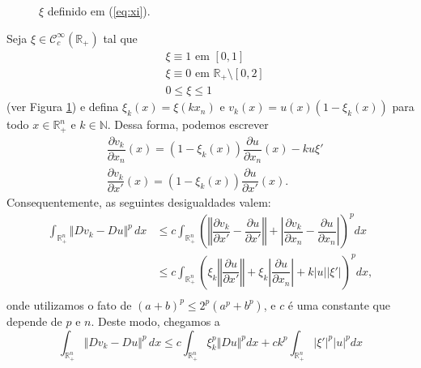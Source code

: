 \documentclass[a4paper, 11pt]{book}
\theoremstyle{definition}
\newcommand{\bN}{\mathbb{N}}
\newcommand{\bR}{\mathbb{R}}
\newcommand{\cC}{\mathcal{C}}
\begin{document}
\begin{prf}
\begin{figure}
        \caption{$\xi$ definido em (\ref{eq:xi}).}
        \label{fig:xi}
    \end{figure}
    Seja $\xi \in \cC^{\infty}_c(\bR_+)$ tal que
    \begin{equation} \label{eq:xi}
        \begin{aligned}
            &\xi \equiv 1 \text{ em } [0,1]\\
            &\xi \equiv 0 \text{ em } \bR_+ \setminus [0,2]\\
            &0 \leqslant \xi \leqslant 1
        \end{aligned}
    \end{equation}
    (ver Figura \ref{fig:xi}) e defina $\xi_k(x) = \xi(kx_n)$ e $v_k(x) = u(x) (1 - \xi_k(x))$ para todo $x \in \bR^n_+$ e $k \in \bN$. Dessa forma, podemos escrever
    \[
        \begin{aligned}
            &\dfrac{\partial v_k}{\partial x_n}(x) = (1 - \xi_k(x))\dfrac{\partial u}{\partial x_n}(x) - ku\xi'\\
            &\dfrac{\partial v_k}{\partial x'}(x) = (1-\xi_k(x))\dfrac{\partial u}{\partial x'}(x).
        \end{aligned}
    \]
    Consequentemente, as seguintes desigualdades valem:
    \[
        \begin{aligned}
            \int_{\bR^n_+} \Vert Dv_k - Du \Vert^p \,dx &\leqslant c \int_{\bR^n_+} \left( \left\Vert \dfrac{\partial v_k}{\partial x'} - \dfrac{\partial u}{\partial x'} \right\Vert + \left| \dfrac{\partial v_k}{\partial x_n} - \dfrac{\partial u}{\partial x_n} \right| \right)^p dx\\
            &\leqslant c  \int_{\bR^n_+} \left( \xi_k\left\Vert \dfrac{\partial u}{\partial x'} \right\Vert + \xi_k \left| \dfrac{\partial u}{\partial x_n}\right| + k |u| |\xi'|  \right)^p dx,\\ 
        \end{aligned}
    \]
    onde utilizamos o fato de $(a + b)^p \leqslant 2^p (a^p + b^p)$, e $c$ é uma constante que depende de $p$ e $n$. Deste modo, chegamos a
    \begin{equation} \label{eq:asxa}
        \int_{\bR^n_+} \Vert Dv_k - Du \Vert^p \,dx \leqslant c \int_{\bR^n_+} \xi_k^p \Vert Du \Vert^p dx + ck^p \int_{\bR^n_+} |\xi'|^p |u|^p dx
    \end{equation}

\end{prf}
\end{document}

